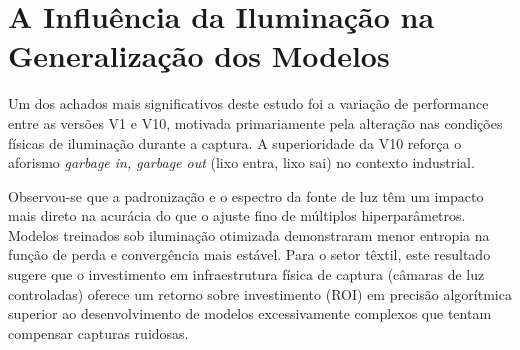 \section{A Influência da Iluminação na Generalização dos Modelos}

Um dos achados mais significativos deste estudo foi a variação de performance entre as versões V1 e V10, motivada primariamente pela alteração nas condições físicas de iluminação durante a captura. A superioridade da V10 reforça o aforismo \textit{garbage in, garbage out} (lixo entra, lixo sai) no contexto industrial.

Observou-se que a padronização e o espectro da fonte de luz têm um impacto mais direto na acurácia do que o ajuste fino de múltiplos hiperparâmetros. Modelos treinados sob iluminação otimizada demonstraram menor entropia na função de perda e convergência mais estável. Para o setor têxtil, este resultado sugere que o investimento em infraestrutura física de captura (câmaras de luz controladas) oferece um retorno sobre investimento (ROI) em precisão algorítmica superior ao desenvolvimento de modelos excessivamente complexos que tentam compensar capturas ruidosas.
